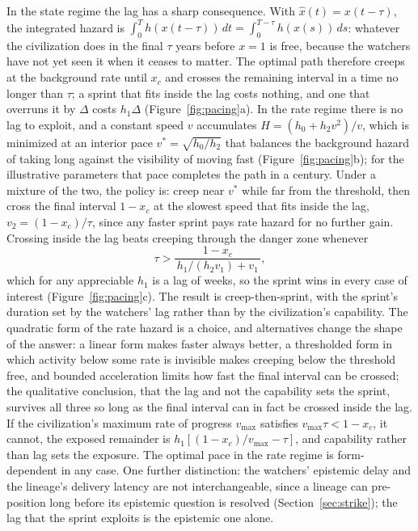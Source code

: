 \documentclass[preprint,12pt]{elsarticle}
\theoremstyle{definition}
\begin{document}
In the state regime the lag has a sharp consequence. With $\hat{x}(t) = x(t - \tau)$, the integrated hazard is $\int_0^{T} h(x(t-\tau))\,dt = \int_0^{T-\tau} h(x(s))\,ds$: whatever the civilization does in the final $\tau$ years before $x = 1$ is free, because the watchers have not yet seen it when it ceases to matter. The optimal path therefore creeps at the background rate until $x_c$ and crosses the remaining interval in a time no longer than $\tau$; a sprint that fits inside the lag costs nothing, and one that overruns it by $\Delta$ costs $h_1 \Delta$ (Figure~\ref{fig:pacing}a). In the rate regime there is no lag to exploit, and a constant speed $v$ accumulates $H = (h_0 + h_2 v^{2})/v$, which is minimized at an interior pace $v^{*} = \sqrt{h_0/h_2}$ that balances the background hazard of taking long against the visibility of moving fast (Figure~\ref{fig:pacing}b); for the illustrative parameters that pace completes the path in a century. Under a mixture of the two, the policy is: creep near $v^{*}$ while far from the threshold, then cross the final interval $1 - x_c$ at the slowest speed that fits inside the lag, $v_2 = (1 - x_c)/\tau$, since any faster sprint pays rate hazard for no further gain. Crossing inside the lag beats creeping through the danger zone whenever
\begin{equation}
\tau > \frac{1 - x_c}{\,h_1/(h_2 v_1) + v_1\,},
\end{equation}
which for any appreciable $h_1$ is a lag of weeks, so the sprint wins in every case of interest (Figure~\ref{fig:pacing}c). The result is creep-then-sprint, with the sprint's duration set by the watchers' lag rather than by the civilization's capability. The quadratic form of the rate hazard is a choice, and alternatives change the shape of the answer: a linear form makes faster always better, a thresholded form in which activity below some rate is invisible makes creeping below the threshold free, and bounded acceleration limits how fast the final interval can be crossed; the qualitative conclusion, that the lag and not the capability sets the sprint, survives all three so long as the final interval can in fact be crossed inside the lag. If the civilization's maximum rate of progress $v_{\max}$ satisfies $v_{\max}\tau < 1 - x_c$, it cannot, the exposed remainder is $h_1[(1-x_c)/v_{\max} - \tau]$, and capability rather than lag sets the exposure. The optimal pace in the rate regime is form-dependent in any case. One further distinction: the watchers' epistemic delay and the lineage's delivery latency are not interchangeable, since a lineage can pre-position long before its epistemic question is resolved (Section~\ref{sec:strike}); the lag that the sprint exploits is the epistemic one alone.
\end{document}
